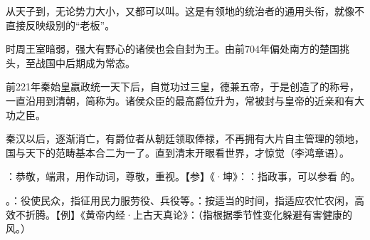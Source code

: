 {\begin{lyenumerate}
从天子到，无论势力大小，又都可以叫。这是有领地的统治者的通用头衔，就像不直接反映级别的“老板”。

时周王室暗弱，强大有野心的诸侯也会自封为王。由前704年偏处南方的楚国挑头，至战国中后期成为常态。%

\item {}前221年秦始皇嬴政统一天下后，自觉功过三皇，德兼五帝，于是创造了的称号，一直沿用到清朝，简称为。诸侯众臣的最高爵位升为，常被封与皇帝的近亲和有大功之臣。

秦汉以后，逐渐消亡，有爵位者从朝廷领取俸禄，不再拥有大片自主管理的领地，国与天下的范畴基本合二为一了。直到清末开眼看世界，才惊觉（李鸿章语）。
\end{lyenumerate}

\item {}：恭敬，端肃，用作动词，尊敬，重视。【参】《·坤》：：指政事，可以参看  的。
\item {}。：役使民众，指征用民力服劳役、兵役等。：按适当的时间，指适应农忙农闲，高效不折腾。【例】《黄帝内经·上古天真论》：（指根据季节性变化躲避有害健康的风。）
}
{}


